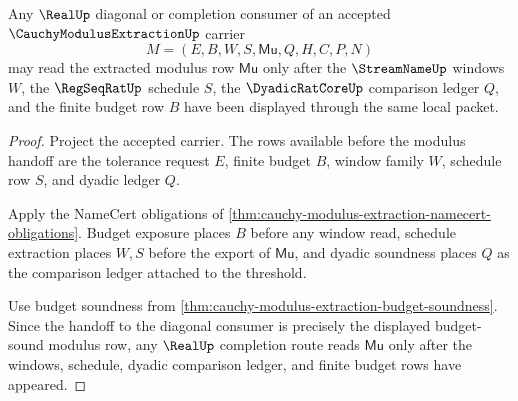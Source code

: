 \begin{theorem}
\label{thm:cauchy-modulus-extraction-real-diagonal-handoff}
Any $\RealUp$ diagonal or completion consumer of an accepted $\CauchyModulusExtractionUp$ carrier
$$
M=(E,B,W,S,\mathsf{Mu},Q,H,C,P,N)
$$
may read the extracted modulus row $\mathsf{Mu}$ only after the $\StreamNameUp$ windows $W$, the $\RegSeqRatUp$ schedule $S$, the $\DyadicRatCoreUp$ comparison ledger $Q$, and the finite budget row $B$ have been displayed through the same local packet.
\end{theorem}
\begin{proof}
Project the accepted carrier. The rows available before the modulus handoff are the tolerance request $E$, finite budget $B$, window family $W$, schedule row $S$, and dyadic ledger $Q$.

Apply the NameCert obligations of \autoref{thm:cauchy-modulus-extraction-namecert-obligations}. Budget exposure places $B$ before any window read, schedule extraction places $W,S$ before the export of $\mathsf{Mu}$, and dyadic soundness places $Q$ as the comparison ledger attached to the threshold.

Use budget soundness from \autoref{thm:cauchy-modulus-extraction-budget-soundness}. Since the handoff to the diagonal consumer is precisely the displayed budget-sound modulus row, any $\RealUp$ completion route reads $\mathsf{Mu}$ only after the windows, schedule, dyadic comparison ledger, and finite budget rows have appeared.
\end{proof}

